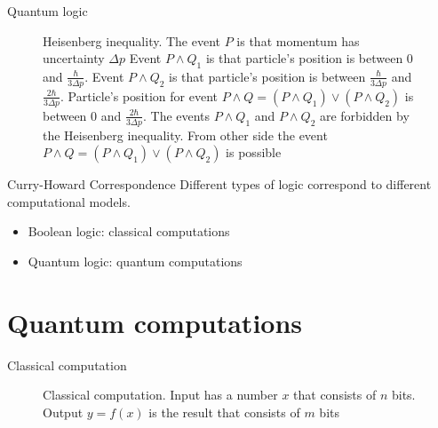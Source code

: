 \documentclass[10pt,pdf,hyperref={unicode}]{beamer}
\begin{document}
\begin{frame}{Quantum logic}
\begin{figure}[H]
  \centering
  \caption{Heisenberg inequality. The event $P$ is that momentum has
    uncertainty $\Delta p$ Event $P \land Q_1$ is that particle's
    position is between $0$ and $\frac{\hbar}{3 \Delta p}$. Event
    $P \land Q_2$ is that particle's
    position is between $\frac{\hbar}{3 \Delta p}$ and
    $\frac{2\hbar}{3 \Delta p}$. Particle's position for event $P
    \land Q = (P \land Q_1)
    \lor (P \land Q_2)$ is between $0$ and $\frac{2\hbar}{3 \Delta p}$. The
    events $P \land Q_1$ and $P \land Q_2$ are forbidden by the Heisenberg
    inequality. From other side the event $P \land Q = (P \land Q_1)
    \lor (P \land Q_2)$ is possible}   
\end{figure}
\end{frame}


\begin{frame}{Curry-Howard Correspondence}
  Different types of logic correspond to different computational models.
  \begin{itemize}
    \item Boolean logic: classical computations
    \item Quantum logic: quantum computations
  \end{itemize}
\end{frame}

\section{Quantum computations}

\begin{frame}{Classical computation}
\begin{figure}
\centering



\caption{Classical computation. Input has a number $x$ that consists
  of  $n$ bits. Output $y = f\left(x\right)$ is the result that
  consists of $m$ bits}
\label{figQuantCompClassComp}
\end{figure}
\end{frame}
\end{document}
